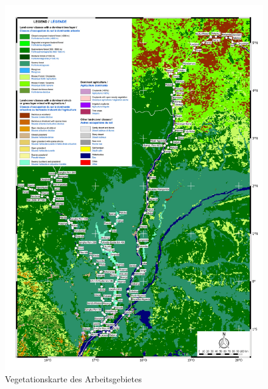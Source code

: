 \begin{figure}[p]
\centering
\includegraphics[width=\textwidth]{fig/1-5_Vegetation.pdf}
\caption{Vegetationskarte des Arbeitsgebietes \parencite[nach][]{Mayaux.2003}}
\label{fig:VegetationKarte}
\end{figure}

